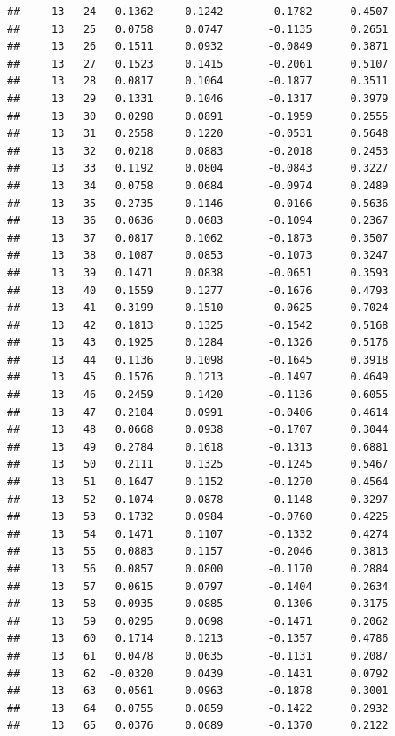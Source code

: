 \documentclass[
]{article}
\begin{document}
\begin{verbatim}
##     13   24   0.1362     0.1242       -0.1782      0.4507 
##     13   25   0.0758     0.0747       -0.1135      0.2651 
##     13   26   0.1511     0.0932       -0.0849      0.3871 
##     13   27   0.1523     0.1415       -0.2061      0.5107 
##     13   28   0.0817     0.1064       -0.1877      0.3511 
##     13   29   0.1331     0.1046       -0.1317      0.3979 
##     13   30   0.0298     0.0891       -0.1959      0.2555 
##     13   31   0.2558     0.1220       -0.0531      0.5648 
##     13   32   0.0218     0.0883       -0.2018      0.2453 
##     13   33   0.1192     0.0804       -0.0843      0.3227 
##     13   34   0.0758     0.0684       -0.0974      0.2489 
##     13   35   0.2735     0.1146       -0.0166      0.5636 
##     13   36   0.0636     0.0683       -0.1094      0.2367 
##     13   37   0.0817     0.1062       -0.1873      0.3507 
##     13   38   0.1087     0.0853       -0.1073      0.3247 
##     13   39   0.1471     0.0838       -0.0651      0.3593 
##     13   40   0.1559     0.1277       -0.1676      0.4793 
##     13   41   0.3199     0.1510       -0.0625      0.7024 
##     13   42   0.1813     0.1325       -0.1542      0.5168 
##     13   43   0.1925     0.1284       -0.1326      0.5176 
##     13   44   0.1136     0.1098       -0.1645      0.3918 
##     13   45   0.1576     0.1213       -0.1497      0.4649 
##     13   46   0.2459     0.1420       -0.1136      0.6055 
##     13   47   0.2104     0.0991       -0.0406      0.4614 
##     13   48   0.0668     0.0938       -0.1707      0.3044 
##     13   49   0.2784     0.1618       -0.1313      0.6881 
##     13   50   0.2111     0.1325       -0.1245      0.5467 
##     13   51   0.1647     0.1152       -0.1270      0.4564 
##     13   52   0.1074     0.0878       -0.1148      0.3297 
##     13   53   0.1732     0.0984       -0.0760      0.4225 
##     13   54   0.1471     0.1107       -0.1332      0.4274 
##     13   55   0.0883     0.1157       -0.2046      0.3813 
##     13   56   0.0857     0.0800       -0.1170      0.2884 
##     13   57   0.0615     0.0797       -0.1404      0.2634 
##     13   58   0.0935     0.0885       -0.1306      0.3175 
##     13   59   0.0295     0.0698       -0.1471      0.2062 
##     13   60   0.1714     0.1213       -0.1357      0.4786 
##     13   61   0.0478     0.0635       -0.1131      0.2087 
##     13   62  -0.0320     0.0439       -0.1431      0.0792 
##     13   63   0.0561     0.0963       -0.1878      0.3001 
##     13   64   0.0755     0.0859       -0.1422      0.2932 
##     13   65   0.0376     0.0689       -0.1370      0.2122 

\end{verbatim}
\end{document}
